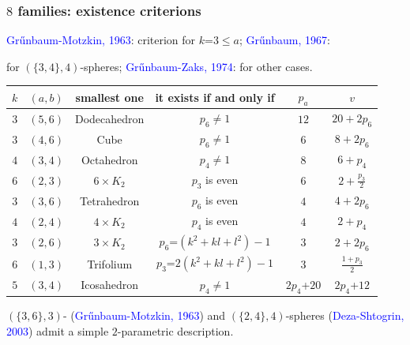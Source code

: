 \documentclass{beamer}
\begin{document}
\begin{frame}\frametitle{$8$ families: existence criterions}
\vspace{-3mm}
\textcolor{blue}{Gr\H{u}nbaum-Motzkin, 1963}: criterion for $k$=$3\le a$;
\textcolor{blue}{Gr\H{u}nbaum, 1967}:

for $(\{3,4\},4)$-spheres;
\textcolor{blue}{Gr\H{u}nbaum-Zaks, 1974}: for other cases.
{\small
\begin{center}
\begin{tabular}{||c|c||c|c|c|c||}
\hline
\hline
$k$ & $(a,b)$ & smallest one & it exists if and only if & $p_a$ & $v$\\
\hline\hline
$3$ & $(5,6)$ & Dodecahedron & $p_{6} \neq 1$ & $12$
&$20+2p_6$\\  \hline
$3$ & $(4,6)$ & Cube & $p_{6} \neq 1$ & $6$ &$8+2p_6$\\ \hline
$4$ & $(3,4)$ & Octahedron & $p_{4} \neq 1$ &
$8$ &$6+p_4$\\ \hline
$6$ & $(2,3)$ & $6\times K_2$ & $p_3$ is even&
$6$ &$2+\frac{p_3}{2}$\\ \hline \hline
$3$ & $(3,6)$ &Tetrahedron  & $p_6$ is even&
$4$ &$4+2p_6$\\ \hline
$4$ & $(2,4)$ & $4\times K_2$ & $p_4$ is even&
$4$ &$2+p_4$\\ \hline \hline
$3$ & $(2,6)$ &$3\times K_2$  & $p_6$=$(k^2+kl+l^2)-1$&
$3$ &$2+2p_6$\\ \hline
$6$ & $(1,3)$ &Trifolium  & $p_3$=$2(k^2+kl+l^2)-1$&
$3$ &$\frac{1+p_3}{2}$\\ \hline\hline\hline
$5$ & $(3,4)$ &Icosahedron  & $p_4\neq 1$&
$2p_4$+$20$ &$2p_4$+$12$\\ \hline\hline
\end{tabular}
\end{center}
}

$(\{3,6\},3)$- (\textcolor{blue}{Gr\H{u}nbaum-Motzkin, 1963}) and
$(\{2,4\},4)$-spheres (\textcolor{blue}{Deza-Shtogrin, 2003})
admit a simple $2$-parametric
 description.
\end{frame}
\end{document}
